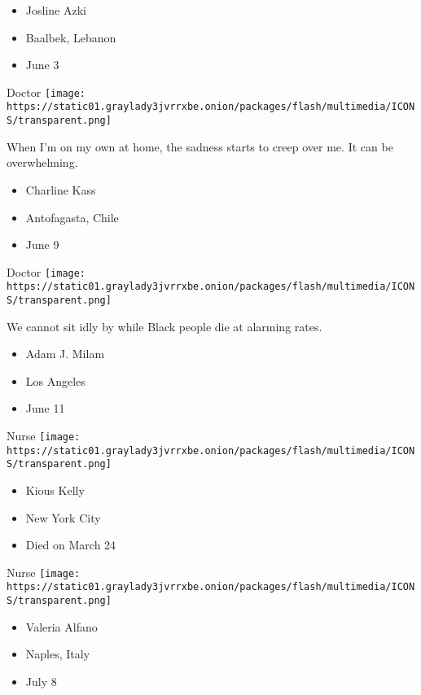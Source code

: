 \begin{itemize}
\tightlist
\item
  Josline Azki
\item
  Baalbek, Lebanon
\item
  June 3
\end{itemize}

\protect\hyperlink{item-charline-kass}{}

Doctor
\texttt{[image: https://static01.graylady3jvrrxbe.onion/packages/flash/multimedia/ICONS/transparent.png]}

When I'm on my own at home, the sadness starts to creep over me. It can
be overwhelming.

\begin{itemize}
\tightlist
\item
  Charline Kass
\item
  Antofagasta, Chile
\item
  June 9
\end{itemize}

\protect\hyperlink{item-adam-j-milam}{}

Doctor
\texttt{[image: https://static01.graylady3jvrrxbe.onion/packages/flash/multimedia/ICONS/transparent.png]}

We cannot sit idly by while Black people die at alarming rates.

\begin{itemize}
\tightlist
\item
  Adam J. Milam
\item
  Los Angeles
\item
  June 11
\end{itemize}

\protect\hyperlink{item-kious-kelly}{}

Nurse
\texttt{[image: https://static01.graylady3jvrrxbe.onion/packages/flash/multimedia/ICONS/transparent.png]}

\begin{itemize}
\tightlist
\item
  Kious Kelly
\item
  New York City
\item
  Died on March 24
\end{itemize}

\protect\hyperlink{item-valeria-alfano}{}

Nurse
\texttt{[image: https://static01.graylady3jvrrxbe.onion/packages/flash/multimedia/ICONS/transparent.png]}

\begin{itemize}
\tightlist
\item
  Valeria Alfano
\item
  Naples, Italy
\item
  July 8
\end{itemize}

